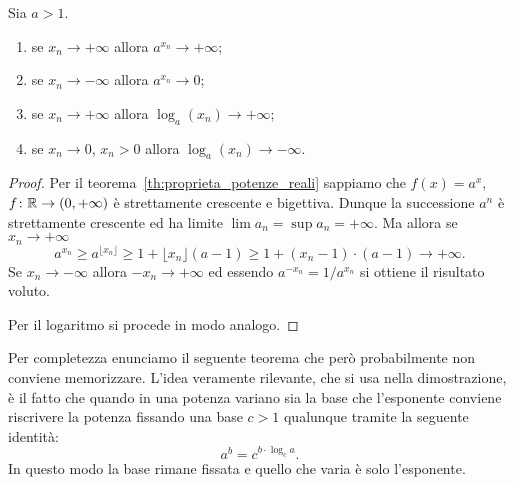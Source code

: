 
\begin{theorem}
\label{th:limite_esponenziale}%
%
%
%
Sia $a>1$.
\begin{enumerate}
\item se $x_n \to +\infty$ allora $a^{x_n} \to +\infty$;
\item se $x_n \to -\infty$ allora $a^{x_n} \to 0$;
\item se $x_n \to +\infty$ allora $\log_a(x_n)\to +\infty$;
\item se $x_n \to 0$, $x_n>0$ allora $\log_a(x_n)\to -\infty$.
\end{enumerate}
\end{theorem}
%
\begin{proof}
Per il teorema~\ref{th:proprieta_potenze_reali}
sappiamo che $f(x)=a^x$, $f\colon \mathbb R \to (0,+\infty)$
è strettamente crescente e bigettiva.
Dunque la successione $a^n$ è strettamente crescente
ed ha limite $\lim a_n = \sup a_n = +\infty$.
Ma allora se $x_n \to +\infty$
\[
  a^{x_n} \ge a^{\lfloor x_n \rfloor}
  \ge 1 + \lfloor x_n \rfloor (a-1)
  \ge 1 + (x_n-1)\cdot(a-1)
  \to +\infty.
\]
Se $x_n \to -\infty$ allora $-x_n \to +\infty$ ed essendo
$a^{-x_n} = 1/ a^{x_n}$ si ottiene il risultato voluto.

Per il logaritmo si procede in modo analogo.
\end{proof}


Per completezza enunciamo il seguente teorema che però
probabilmente non conviene memorizzare.
L'idea veramente rilevante, che si usa nella dimostrazione,
è il fatto che quando in una potenza variano sia la base
che l'esponente conviene riscrivere la potenza fissando
una base $c>1$ qualunque
tramite la seguente identità:
\[
  a^b = c^{b\cdot \log_c a}.
\]
In questo modo la base rimane fissata e quello
che varia è solo l'esponente.

